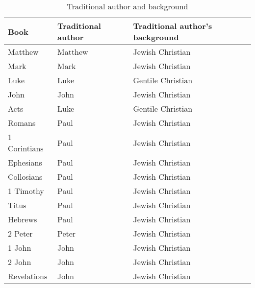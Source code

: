 \documentclass{article}
\begin{document}
\begin{table}
    \centering
    \begin{tabular}{lll}
    \toprule
        Book & Traditional author & Traditional author's background \\
    \midrule
        Matthew & Matthew & Jewish Christian \\
        Mark & Mark & Jewish Christian \\
        Luke & Luke & Gentile Christian \\
        John & John & Jewish Christian \\
        Acts & Luke & Gentile Christian \\
        Romans & Paul & Jewish Christian \\
        1 Corintians & Paul & Jewish Christian \\
        Ephesians & Paul & Jewish Christian \\
        Collosians & Paul & Jewish Christian \\
        1 Timothy & Paul & Jewish Christian \\
        Titus & Paul & Jewish Christian \\
        Hebrews & Paul & Jewish Christian \\
        2 Peter & Peter & Jewish Christian \\
        1 John & John & Jewish Christian \\
        2 John & John & Jewish Christian \\
        Revelations & John & Jewish Christian \\
    \bottomrule
    \end{tabular}
    \caption{Traditional author and background}
    \label{traditionalauthor}
\end{table}
\end{document}
